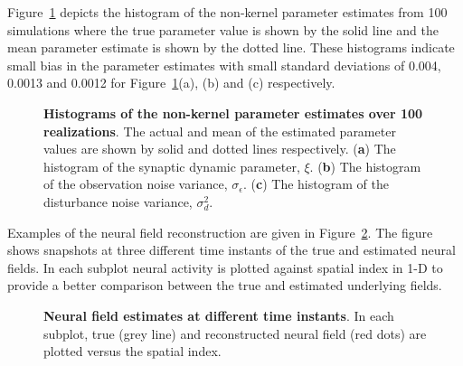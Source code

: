 \documentclass[]{article}
\begin{document}
Figure~\ref{fig:EM-Histogram} depicts the histogram of the non-kernel parameter estimates from 100 simulations where the true parameter value is shown by the solid line and the mean parameter estimate is shown by the dotted line. These histograms indicate small bias in the parameter estimates with small standard deviations of 0.004, 0.0013 and 0.0012 for Figure~\ref{fig:EM-Histogram}(a), (b) and (c) respectively.
\begin{figure}[!ht]
\centering
{}
\caption{{\bf Histograms of the non-kernel parameter estimates over 100 realizations}. The actual and mean of the estimated parameter values are shown by solid and dotted lines respectively. (\textbf{a}) The histogram of the synaptic dynamic parameter, $\xi$. (\textbf{b}) The histogram of the observation noise variance, $\sigma_{\epsilon}$. (\textbf{c}) The histogram of the disturbance noise variance, $\sigma_d^2$.}
\label{fig:EM-Histogram}
\end{figure}
Examples of the neural field reconstruction are given in Figure~\ref{fig:FieldEstimates}.  The figure shows snapshots at three different time instants of the true and estimated neural fields. In each subplot neural activity is plotted against spatial index in 1-D to provide a better comparison between the true and estimated underlying fields. 
\begin{figure}[!ht]
\centering
{}
\caption{{\bf Neural field estimates at different time instants}. In each subplot, true (grey line) and reconstructed neural field (red dots) are plotted versus the spatial index.}
\label{fig:FieldEstimates}
\end{figure}
\end{document}
